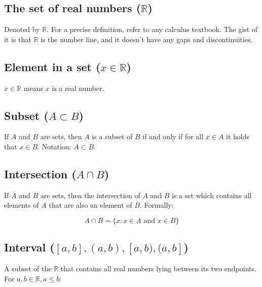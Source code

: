 \documentclass[titlepage]{article}
\begin{document}
      \subsection{The set of real numbers ($\mathbb{R}$)}

        Denoted by $\mathbb{R}$. For a precise definition, refer to any
        calculus textbook. The gist of it is that $\mathbb{R}$ is the number
        line, and it doesn't have any gaps and discontinuities.

      \subsection{Element in a set ($x \in \mathbb{R}$)}

        $x \in \mathbb{R}$ means $x$ is a real number.

      \subsection{Subset ($A \subset B$)}

        If $A$ and $B$ are sets, then $A$ is a subset of $B$ if and only if
        for all $x \in A$ it holds that $x \in B$. Notation: $A \subset B$.

      \subsection{Intersection ($A \cap B$)}

        If $A$ and $B$ are sets, then the intersection of $A$ and $B$ is a set
        which contains all elements of $A$ that are also an element of $B$.
        Formally:

        $$A \cap B = \{ x : x \in A \text{ and } x \in B \}$$

      \subsection{Interval ($[a, b], (a, b), [a, b), (a, b]$)}

        A subset of the $\mathbb{R}$ that contains all real numbers lying
        between its two endpoints. For $a, b \in \mathbb{R}, a \leq b$:
\end{document}
